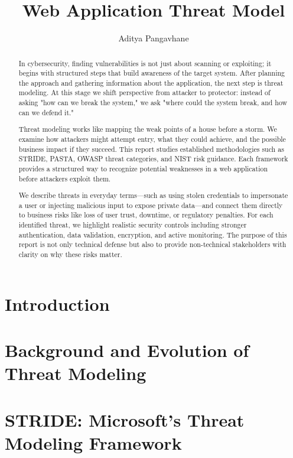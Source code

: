 \documentclass{article}
\title{Web Application Threat Model}
\author{Aditya Pangavhane}
\begin{document}
\maketitle

\begin{abstract}
In cybersecurity, finding vulnerabilities is not just about scanning or exploiting; it begins with structured steps that build awareness of the target system. After planning the approach and gathering information about the application, the next step is threat modeling. At this stage we shift perspective from attacker to protector: instead of asking "how can we break the system," we ask "where could the system break, and how can we defend it."

Threat modeling works like mapping the weak points of a house before a storm. We examine how attackers might attempt entry, what they could achieve, and the possible business impact if they succeed. This report studies established methodologies such as STRIDE, PASTA, OWASP threat categories, and NIST risk guidance. Each framework provides a structured way to recognize potential weaknesses in a web application before attackers exploit them.

We describe threats in everyday terms—such as using stolen credentials to impersonate a user or injecting malicious input to expose private data—and connect them directly to business risks like loss of user trust, downtime, or regulatory penalties. For each identified threat, we highlight realistic security controls including stronger authentication, data validation, encryption, and active monitoring. The purpose of this report is not only technical defense but also to provide non-technical stakeholders with clarity on why these risks matter.
\end{abstract}



\section{Introduction}


\section{Background and Evolution of Threat Modeling}


\section{STRIDE: Microsoft’s Threat Modeling Framework}

\end{document}
